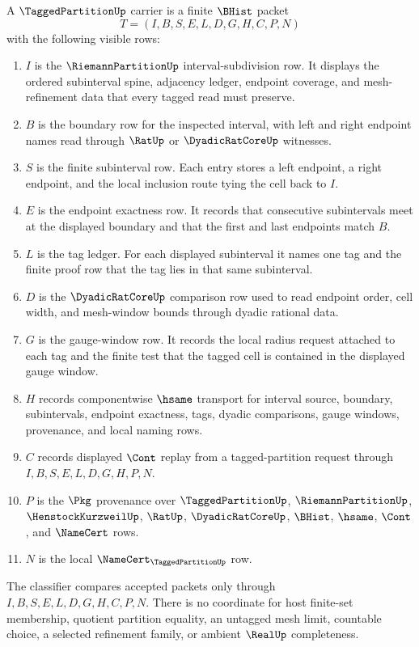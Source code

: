 \begin{definition}
\label{def:tagged-partition-carrier}
A $\TaggedPartitionUp$ carrier is a finite $\BHist$ packet
$$
T=(I,B,S,E,L,D,G,H,C,P,N)
$$
with the following visible rows:
\begin{enumerate}
\item $I$ is the $\RiemannPartitionUp$ interval-subdivision row. It displays the ordered subinterval spine, adjacency ledger, endpoint coverage, and mesh-refinement data that every tagged read must preserve.
\item $B$ is the boundary row for the inspected interval, with left and right endpoint names read through $\RatUp$ or $\DyadicRatCoreUp$ witnesses.
\item $S$ is the finite subinterval row. Each entry stores a left endpoint, a right endpoint, and the local inclusion route tying the cell back to $I$.
\item $E$ is the endpoint exactness row. It records that consecutive subintervals meet at the displayed boundary and that the first and last endpoints match $B$.
\item $L$ is the tag ledger. For each displayed subinterval it names one tag and the finite proof row that the tag lies in that same subinterval.
\item $D$ is the $\DyadicRatCoreUp$ comparison row used to read endpoint order, cell width, and mesh-window bounds through dyadic rational data.
\item $G$ is the gauge-window row. It records the local radius request attached to each tag and the finite test that the tagged cell is contained in the displayed gauge window.
\item $H$ records componentwise $\hsame$ transport for interval source, boundary, subintervals, endpoint exactness, tags, dyadic comparisons, gauge windows, provenance, and local naming rows.
\item $C$ records displayed $\Cont$ replay from a tagged-partition request through $I,B,S,E,L,D,G,H,P,N$.
\item $P$ is the $\Pkg$ provenance over $\TaggedPartitionUp$, $\RiemannPartitionUp$, $\HenstockKurzweilUp$, $\RatUp$, $\DyadicRatCoreUp$, $\BHist$, $\hsame$, $\Cont$, and $\NameCert$ rows.
\item $N$ is the local $\NameCert_{\TaggedPartitionUp}$ row.
\end{enumerate}
The classifier compares accepted packets only through $I,B,S,E,L,D,G,H,C,P,N$. There is no coordinate for host finite-set membership, quotient partition equality, an untagged mesh limit, countable choice, a selected refinement family, or ambient $\RealUp$ completeness.
\end{definition}

